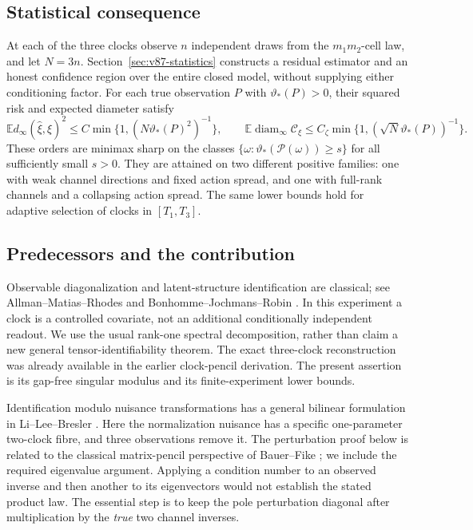 \documentclass[11pt,reqno]{amsart}
\numberwithin{equation}{section}
\theoremstyle{definition}\newtheorem{definition}[theorem]{Definition}
\theoremstyle{remark}\newtheorem{remark}[theorem]{Remark}
\newcommand{\E}{\mathbb E}
\newcommand{\diam}{\operatorname{diam}}
\newcommand{\cC}{\mathcal C}
\newcommand{\sig}{\vartheta}
\begin{document}
\subsection{Statistical consequence}
At each of the three clocks observe $n$ independent draws from the
$m_1m_2$-cell law, and let $N=3n$.
Section~\ref{sec:v87-statistics} constructs a residual estimator and
an honest confidence region over the entire closed model, without
supplying either conditioning factor. For each true observation $P$
with $\sig_*(P)>0$, their squared risk and expected diameter satisfy
\begin{equation}\label{eq:v87-stat-summary}
 \E d_\infty(\widehat\xi,\xi)^2
       \le C\min\{1,(N\sig_*(P)^2)^{-1}\},\qquad
 \E\diam_\infty\cC_\xi
       \le C_\zeta\min\{1,(\sqrt N\sig_*(P))^{-1}\}.
\end{equation}
These orders are minimax sharp on the classes
$\{\omega:\sig_*(\mathcal P(\omega))\ge s\}$ for all sufficiently
small $s>0$. They are attained on two different positive families:
one with weak channel directions and fixed action spread, and one
with full-rank channels and a collapsing action spread. The same
lower bounds hold for adaptive selection of clocks in $[T_1,T_3]$.

\subsection{Predecessors and the contribution}
Observable diagonalization and latent-structure identification are
classical; see Allman--Matias--Rhodes \cite{AMR} and
Bonhomme--Jochmans--Robin \cite{BJR}. In this experiment a clock is a
controlled covariate, not an additional conditionally independent
readout. We use the usual rank-one spectral decomposition, rather
than claim a new general tensor-identifiability theorem. The exact
three-clock reconstruction was already available in the earlier
clock-pencil derivation. The present assertion is its gap-free
singular modulus and its finite-experiment lower bounds.

Identification modulo nuisance transformations has a general
bilinear formulation in Li--Lee--Bresler \cite{LLB}. Here the
normalization nuisance has a specific one-parameter two-clock fibre,
and three observations remove it. The perturbation proof below is
related to the classical matrix-pencil perspective of Bauer--Fike
\cite{BF}; we include the required eigenvalue argument. Applying a
condition number to an observed inverse and then another to its
eigenvectors would not establish the stated product law. The essential
step is to keep the pole perturbation diagonal after multiplication
by the \emph{true} two channel inverses.
\end{document}
